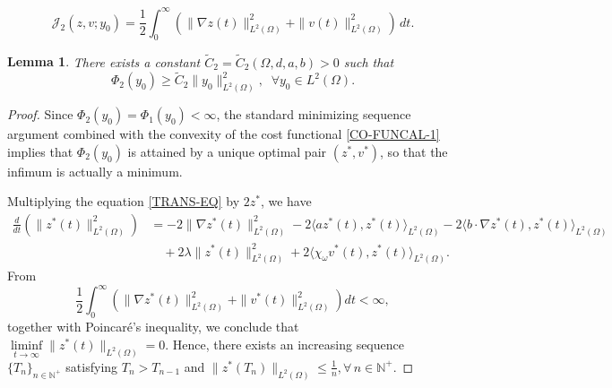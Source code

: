 \documentclass[10pt,a4paper]{amsart}
\newtheorem{lemma}{Lemma}
\begin{document}
\begin{equation}\label{CO-FUNCAL-1}
\mathcal J_2(z,v;y_0)=\frac12\int_0^\infty\left(\|\nabla z(t)\|_{L^2(\Omega)}^2+\|v(t)\|_{L^2(\Omega)}^2\right)\,dt.
\end{equation} 

\begin{lemma}\label{PHIBOUND-NEW-18}
There exists a constant $\tilde{C}_2=\tilde{C}_2(\Omega,d,a,b)>0$ such that
\begin{equation}\label{PHI-bound-low-523} 
{\Phi_2} (y_0) \ge \tilde C_2\|y_0\|_{L^2(\Omega)}^2,\;\;\forall y_0\in L^2(\Omega).
\end{equation}
\end{lemma}

\begin{proof}
Since $\Phi_2(y_0)=\Phi_1(y_0)<\infty$, the standard minimizing sequence argument combined with the convexity of the cost functional \eqref{CO-FUNCAL-1} implies that $\Phi_2(y_0)$ is attained by a unique optimal pair $(z^*,v^*)$, so that the infimum is actually a minimum. 

Multiplying the equation \eqref{TRANS-EQ} by $2z^*$, we have
\begin{equation}\label{ENE-EST-1}
\begin{aligned}
\frac{d}{dt}\left(\|z^*(t)\|_{L^2(\Omega)}^2\right)&= -2\|\nabla z^*(t)\|_{L^2(\Omega)}^2
- 2\langle a z^*(t), z^*(t)\rangle_{L^2(\Omega)}- 2\langle b \cdot \nabla z^*(t), z^*(t)\rangle_{L^2(\Omega)}\\
&\quad+2\lambda\|z^*(t)\|_{L^2(\Omega)}^2+ 2\langle \chi_\omega v^*(t), z^*(t)\rangle_{L^2(\Omega)}.
\end{aligned}
\end{equation}
From
$$\frac{1}{2} \int_0^\infty  \left(\|\nabla z^*(t)\|_{L^2(\Omega)}^2 + \|v^*(t)\|_{L^2(\Omega)}^2\right) dt<\infty,$$
together with Poincar\'e's inequality, we conclude that
$\liminf\limits_{t\to \infty} \| z^*(t)\|_{L^2(\Omega)} =0$.
Hence, there exists an increasing sequence $\{T_n\}_{n\in\mathbb{N}^+}$ satisfying $T_n > T_{n-1}$ and $\|z^*(T_n)\|_{L^2(\Omega)} \le \frac{1}{n}, \forall\,n\in\mathbb{N}^+$.


\end{proof}
\end{document}
